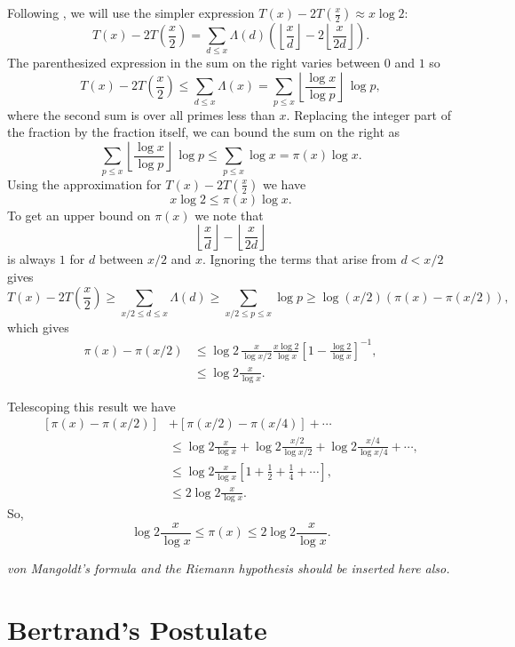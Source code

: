 Following {\DavenportH} \cite{Davenport:Multiplicative}, we will use the
simpler expression $T(x) - 2 T(\frac{x}{2}) \approx x \log 2$:
\[
T(x) - 2 T(\frac{x}{2}) = 
  \sum_{d\le x} \Lambda(d) \left( \left\lfloor \frac{x}{d}\right\rfloor 
     - 2 \left\lfloor \frac{x}{2d}\right\rfloor \right).
\]
The parenthesized expression in the sum on the right varies between $0$ and $1$
so
\[
T(x) - 2 T(\frac{x}{2}) \le \sum_{d\le x} \Lambda(x)
= \sum_{p \le x} \left\lfloor \frac{\log x}{\log p}\right\rfloor \, \log p,
\]
where the second sum is over all primes less than $x$.  Replacing the
integer part of the fraction by the fraction itself, we can bound the
sum on the right as
\[
\sum_{p \le x} \left\lfloor \frac{\log x}{\log p}\right\rfloor \, \log p
\le \sum_{p \le x} \log x = \pi(x) \log x.
\]
Using  the approximation  for $T(x) - 2
T(\frac{x}{2})$ we have 
\[
x \log 2 \le \pi(x) \log x.
\]
To get an upper bound on $\pi(x)$ we note that 
\[
\left\lfloor \frac{x}{d}\right\rfloor - \left\lfloor \frac{x}{2d}\right\rfloor 
\]
is always $1$ for $d$ between $x/2$ and $x$.  Ignoring the terms that arise
from $d < x/2$ gives
\[
T(x) - 2 T(\frac{x}{2}) \ge \sum_{x/2 \le d \le x} \Lambda(d) 
 \ge \sum_{x/2 \le p \le x} \log p \ge \log(x/2) \left( \pi(x) - \pi(x/2)
\right), 
\]
which gives
\[
\begin{aligned}
\pi(x) - \pi(x/2) & \le \log 2 \, \frac{x}{\log x/2}
\frac{x \log 2}{\log x} \left[ 1 - \frac{\log 2}{\log x}\right]^{-1},\\
& \le \log 2 \frac{x}{\log x}.
\end{aligned}
\]

Telescoping this result we have
\[
\begin{aligned}
\left[\pi(x) - \pi(x/2)\right] &+ 
\left[\pi(x/2) - \pi(x/4)\right] + \cdots \\
& \displaystyle \le \log 2 \frac{x}{\log x} + 
\log2 \frac{x/2}{\log x/2} + \log2 \frac{x/4}{\log x/4} + \cdots, \\
& \le \log 2 \frac{x}{\log x} 
     \left[ 1 + \frac{1}{2} + \frac{1}{4} + \cdots\right], \\
& \le 2 \log 2 \frac{x}{\log x}.
\end{aligned}
\]
So,
\[
\log 2 \frac{x}{\log x} \le \pi(x) \le 2 \log 2 \frac{x}{\log x}.
\]

{\em von Mangoldt's formula and the Riemann hypothesis should be
inserted here also.}

\section{Bertrand's Postulate}
\label{Bertrands:Sec}

